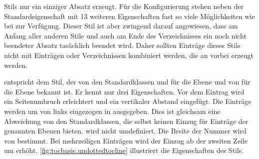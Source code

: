 \begin{description}
  Stils nur ein einziger Absatz erzeugt.  Für die
  Konfigurierung stehen
  neben der Standardeigenschaft  mit 13 weiteren Eigenschaften
  fast so viele Möglichkeiten wie bei  zur Verfügung. Dieser
  Stil ist aber zwingend darauf angewiesen, dass am Anfang aller anderen Stile
  und auch am Ende des Verzeichnisses ein noch nicht beendeter Absatz
  tasächlich beendet wird. Daher sollten Einträge dieses Stils nicht mit
  Einträgen oder Verzeichnissen kombiniert werden, die an 
  vorbei erzeugt werden.
\item[\PValue{undottedtocline}] entspricht dem Stil, der von den
  Standardklassen  und  für die Ebene
   und von  für die Ebene 
  bekannt ist. Er kennt nur drei Eigenschaften.
  Vor dem Eintrag wird ein Seitenumbruch erleichtert und ein vertikaler
  Abstand eingefügt. Die Einträge werden um  von links
  eingezogen in  ausgegeben. Dies ist gleichsam eine
  Abweichung von den Standardklassen, die selbst keinen Einzug für Einträge
  der genannten Ebenen bieten.  wird nicht
  umdefiniert. Die Breite der Nummer wird von  bestimmt. Bei
  mehrzeiligen Einträgen wird der Einzug ab der zweiten Zeile um
   erhöht. \autoref{fig:tocbasic.undottedtocline} illustriert
  die Eigenschaften des Stils.
  \begin{figure}
    \centering
\end{figure}
\end{description}
